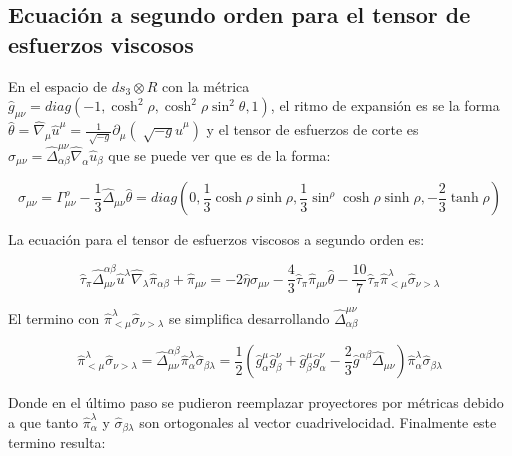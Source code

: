 \documentclass[11pt,a4paper]{article}
\begin{document}
\subsection{Ecuación a segundo orden para el tensor de esfuerzos viscosos}


En el espacio de $ds_{3}{\otimes}R$ con la métrica $\hat{g}_{{\mu}{\nu}}=diag(-1,\cosh^2\rho,\cosh^2\rho\sin^2\theta,1)$, el ritmo de expansión es se la forma $\hat{\theta}=\hat{\nabla}_{\mu}\hat{u}^{\mu}=\frac{1}{\sqrt[]{-g}}\partial_{\mu}(\sqrt[]{-g}\hat{u}^{\mu})$ y el tensor de esfuerzos de corte es $\sigma_{{\mu}{\nu}}=\hat{\Delta}^{{\mu}{\nu}}_{{\alpha}{\beta}}\hat{\nabla}_{\alpha}\hat{u}_{\beta}$ que se puede ver que es de la forma:

\begin{equation}
\sigma_{{\mu}{\nu}}=\Gamma^{\rho}_{{\mu}{\nu}}-\frac{1}{3}\hat{\Delta}_{{\mu}{\nu}}\hat{\theta}= diag(0,\frac{1}{3}\cosh\rho\sinh\rho,\frac{1}{3}\sin^\rho\cosh\rho\sinh\rho,-\frac{2}{3}\tanh\rho)
\label{esfuerzp_de_corte}
\end{equation}

La ecuación para el tensor de esfuerzos viscosos a segundo orden es:

\begin{equation}
\hat{\tau}_{\pi}\hat{\Delta}^{{\alpha}{\beta}}_{{\mu}{\nu}}\hat{u}^{\lambda}\hat{\nabla}_{\lambda}\hat{\pi}_{{\alpha}{\beta}}+\hat{\pi}_{{\mu}{\nu}}=-2\hat{\eta}\hat{\sigma}_{{\mu}{\nu}}-\frac{4}{3}\hat{\tau}_{\pi}\hat{\pi}_{{\mu}{\nu}}\hat{\theta}-\frac{10}{7}\hat{\tau}_{\pi}\hat{\pi}^{\lambda}_{<\mu}\hat{\sigma}_{{\nu>}{\lambda}}
\label{shear_segundo_orden}
\end{equation}

El termino con $\hat{\pi}^{\lambda}_{<\mu}\hat{\sigma}_{{\nu>}{\lambda}}$ se simplifica desarrollando $\hat{\Delta}^{{\mu}{\nu}}_{{\alpha}{\beta}}$

\begin{equation}
\hat{\pi}^{\lambda}_{<\mu}\hat{\sigma}_{{\nu>}{\lambda}}=\hat{\Delta}^{{\alpha}{\beta}}_{{\mu}{\nu}}\hat{\pi}^{\lambda}_{\alpha}\hat{\sigma}_{{\beta}{\lambda}}=
\frac{1}{2}(\hat{g}^{\mu}_{\alpha}\hat{g}^{\nu}_{\beta}+\hat{g}^{\mu}_{\beta}\hat{g}^{\nu}_{\alpha}-\frac{2}{3}\hat{g}^{{\alpha}{\beta}}\hat{\Delta}_{{\mu}{\nu}})\hat{\pi}^{\lambda}_{\alpha}\hat{\sigma}_{{\beta}{\lambda}}
\end{equation}

Donde en el último paso se pudieron reemplazar proyectores por métricas debido a que tanto $\hat{\pi}^{\lambda}_{\alpha}$ y $\hat{\sigma}_{{\beta}{\lambda}}$ son ortogonales al vector cuadrivelocidad. Finalmente este termino resulta:
\end{document}
